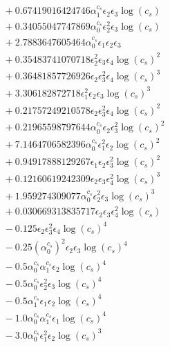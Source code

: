 \documentclass[10pt]{article}
\begin{document}
\begin{align*}
&{}  + 0.67419016424746 \alpha_{1}^{c_s} \epsilon_{2} \epsilon_{3} \log{\left(c_{s} \right)} \\
&{}  + 0.34055047747869 \alpha_{0}^{c_s} \epsilon_{2}^{2} \epsilon_{3} \log{\left(c_{s} \right)} \\
&{}  + 2.7883647605464 \alpha_{0}^{c_s} \epsilon_{1} \epsilon_{2} \epsilon_{3} \\
&{}  + 0.35483741070718 \epsilon_{2}^{2} \epsilon_{3} \epsilon_{4} \log{\left(c_{s} \right)}^{2} \\
&{}  + 0.36481857726926 \epsilon_{2} \epsilon_{3}^{2} \epsilon_{4} \log{\left(c_{s} \right)}^{3} \\
&{}  + 3.306182872718 \epsilon_{1}^{2} \epsilon_{2} \epsilon_{3} \log{\left(c_{s} \right)}^{3} \\
&{}  + 0.21757249210578 \epsilon_{2} \epsilon_{3}^{2} \epsilon_{4} \log{\left(c_{s} \right)}^{2} \\
&{}  + 0.21965598797644 \alpha_{0}^{c_s} \epsilon_{2} \epsilon_{3}^{2} \log{\left(c_{s} \right)}^{2} \\
&{}  + 7.1464706582396 \alpha_{0}^{c_s} \epsilon_{1}^{2} \epsilon_{2} \log{\left(c_{s} \right)}^{2} \\
&{}  + 0.94917888129267 \epsilon_{1} \epsilon_{2} \epsilon_{3}^{2} \log{\left(c_{s} \right)}^{2} \\
&{}  + 0.12160619242309 \epsilon_{2} \epsilon_{3} \epsilon_{4}^{2} \log{\left(c_{s} \right)}^{3} \\
&{}  + 1.959274309077 \alpha_{0}^{c_s} \epsilon_{2}^{2} \epsilon_{3} \log{\left(c_{s} \right)}^{3} \\
&{}  + 0.030669313835717 \epsilon_{2} \epsilon_{3} \epsilon_{4}^{2} \log{\left(c_{s} \right)} \\
&{}  - 0.125 \epsilon_{2} \epsilon_{3}^{2} \epsilon_{4} \log{\left(c_{s} \right)}^{4} \\
&{}  - 0.25 \left(\alpha_{0}^{c_s}\right)^{2} \epsilon_{2} \epsilon_{3} \log{\left(c_{s} \right)}^{4} \\
&{}  - 0.5 \alpha_{0}^{c_s} \alpha_{1}^{c_s} \epsilon_{2} \log{\left(c_{s} \right)}^{4} \\
&{}  - 0.5 \alpha_{0}^{c_s} \epsilon_{2}^{2} \epsilon_{3} \log{\left(c_{s} \right)}^{4} \\
&{}  - 0.5 \alpha_{1}^{c_s} \epsilon_{1} \epsilon_{2} \log{\left(c_{s} \right)}^{4} \\
&{}  - 1.0 \alpha_{0}^{c_s} \alpha_{1}^{c_s} \epsilon_{1} \log{\left(c_{s} \right)}^{4} \\
&{}  - 3.0 \alpha_{0}^{c_s} \epsilon_{1}^{2} \epsilon_{2} \log{\left(c_{s} \right)}^{3} \\

\end{align*}
\end{document}
